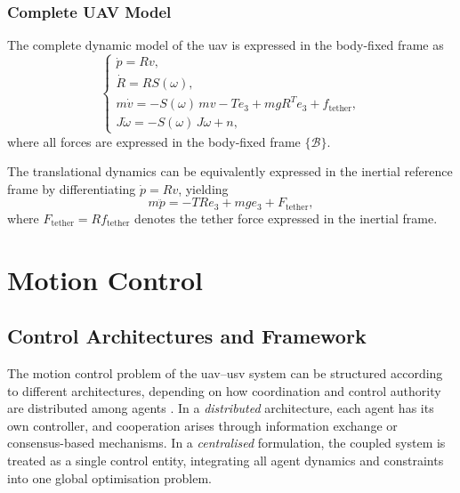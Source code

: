 \subsubsection{Complete UAV Model}

The complete dynamic model of the \gls{uav} is expressed in the body-fixed frame as
\begin{equation}
\begin{cases}
\dot{p} = R v, \\[6pt]
\dot{R} = R S(\omega), \\[6pt]
m \dot{v} =
- S(\omega)\, m v
- T e_3
+ m g R^{T} e_3
+ f_{\text{tether}}, \\[10pt]
J \dot{\omega} =
- S(\omega)\, J \omega
+ n,
\end{cases}
\end{equation}
where all forces are expressed in the body-fixed frame \(\{\mathcal{B}\}\).

The translational dynamics can be equivalently expressed in the inertial reference frame by differentiating \(\dot{p} = R v\), yielding
\begin{equation}
m \ddot{p} = -T R e_3 + m g e_3 + F_{\text{tether}},
\label{eq:inertial_dynamics}
\end{equation}
where \(F_{\text{tether}} = R f_{\text{tether}}\) denotes the tether force expressed in the inertial frame.









\section{Motion Control}
\label{sec:theoretical_model_2}

\subsection{Control Architectures and Framework}
\label{subsec:control_methodology}

The motion control problem of the \gls{uav}--\gls{usv} system can be structured according to different architectures, depending on how coordination and control authority are distributed among agents \citep{olfati-saberConsensusCooperationNetworked2007,renDistributedConsensusMultiVehicle2010}. In a \emph{distributed} architecture, each agent has its own controller, and cooperation arises through information exchange or consensus-based mechanisms. In a \emph{centralised} formulation, the coupled system is treated as a single control entity, integrating all agent dynamics and constraints into one global optimisation problem.

